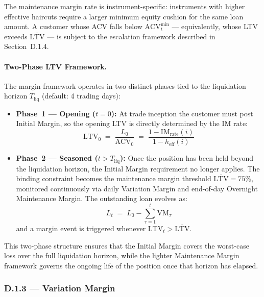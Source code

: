 \documentclass[9pt, a4paper]{extarticle}
\begin{document}
The maintenance margin rate is instrument-specific: instruments with higher effective
haircuts require a larger minimum equity cushion for the same loan amount. A customer
whose ACV falls below $\mathrm{ACV}^{\min}_t$ — equivalently, whose LTV exceeds
$\overline{\mathrm{LTV}}$ — is subject to the escalation framework described in
Section~D.1.4.

\paragraph{Two-Phase LTV Framework.}
The margin framework operates in two distinct phases tied to the liquidation horizon
$T_{\text{liq}}$ (default: 4 trading days):

\begin{itemize}[leftmargin=2em]
    \item \textbf{Phase~1 — Opening ($t = 0$):} At trade inception the customer must
          post Initial Margin, so the opening LTV is directly determined by the IM
          rate:
          \begin{equation*}
              \mathrm{LTV}_0 \;=\; \frac{L_0}{\mathrm{ACV}_0}
                              \;=\; \frac{1 - \mathrm{IM}_{\text{rate}}(i)}{1 - h_{\mathrm{eff}}(i)}
          \end{equation*}

    \item \textbf{Phase~2 — Seasoned ($t > T_{\text{liq}}$):} Once the position has
          been held beyond the liquidation horizon, the Initial Margin requirement no
          longer applies. The binding constraint becomes the maintenance margin
          threshold $\overline{\mathrm{LTV}} = 75\%$, monitored continuously via
          daily Variation Margin and end-of-day Overnight Maintenance Margin. The
          outstanding loan evolves as:
          \begin{equation*}
              L_t \;=\; L_0 - \sum_{\tau=1}^{t} \mathrm{VM}_\tau
          \end{equation*}
          and a margin event is triggered whenever $\mathrm{LTV}_t > \overline{\mathrm{LTV}}$.
\end{itemize}

This two-phase structure ensures that the Initial Margin covers the worst-case loss
over the full liquidation horizon, while the lighter Maintenance Margin framework
governs the ongoing life of the position once that horizon has elapsed.

\subsubsection{D.1.3 — Variation Margin}
\end{document}
